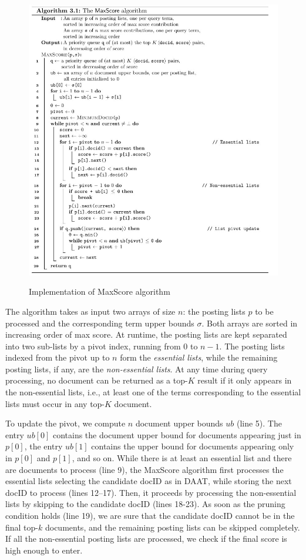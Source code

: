 \begin{figure}[h!]
		\centering
		\includegraphics[scale = 1.4]{img/max score.jpg}
        \label{max score}
        \caption{Implementation of MaxScore algorithm}
\end{figure}

The algorithm takes as input two arrays of size $n$: the posting lists $p$ to be processed and the corresponding term upper bounds $\sigma$. Both arrays are sorted in increasing order of max score. At runtime, the posting lists are kept separated into two sub-lists by a pivot index, running from 0 to $n-1$. The posting lists indexed from the pivot up to $n$ form the \textit{essential lists}, while the remaining posting lists, if any, are the \textit{non-essential lists}. At any time during query processing, no document can be returned as a top-$K$ result if it only appears in the non-essential lists, i.e., at least one of the terms corresponding to the essential lists must occur in any top-$K$ document.

To update the pivot, we compute $n$ document upper bounds $ub$ (line 5). The entry $ub[0]$ contains the document upper bound for documents appearing just in $p[0]$, the entry $ub[1]$ contains the upper bound for documents appearing only in $p[0]$ and $p[1]$, and so on. While there is at least an essential list and there are documents to process (line 9), the MaxScore algorithm first processes the essential lists selecting the candidate docID as in DAAT, while storing the next docID to process (lines 12–17). Then, it proceeds by processing the non-essential lists by skipping to the candidate docID (lines 18-23). As soon as the pruning condition holds (line 19), we are sure that the candidate docID cannot be in the final top-$k$ documents, and the remaining posting lists can be skipped completely. If all the non-essential posting lists are processed, we check if the final score is high enough to enter.


